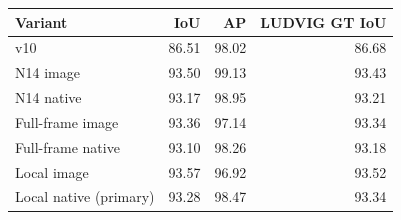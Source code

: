 \begin{tabular}{lrrr}
\toprule
Variant & IoU & AP & LUDVIG GT IoU \\\midrule
v10 & 86.51 & 98.02 & 86.68 \\
N14 image & 93.50 & 99.13 & 93.43 \\
N14 native & 93.17 & 98.95 & 93.21 \\
Full-frame image & 93.36 & 97.14 & 93.34 \\
Full-frame native & 93.10 & 98.26 & 93.18 \\
Local image & 93.57 & 96.92 & 93.52 \\
Local native (primary) & 93.28 & 98.47 & 93.34 \\
\bottomrule
\end{tabular}
